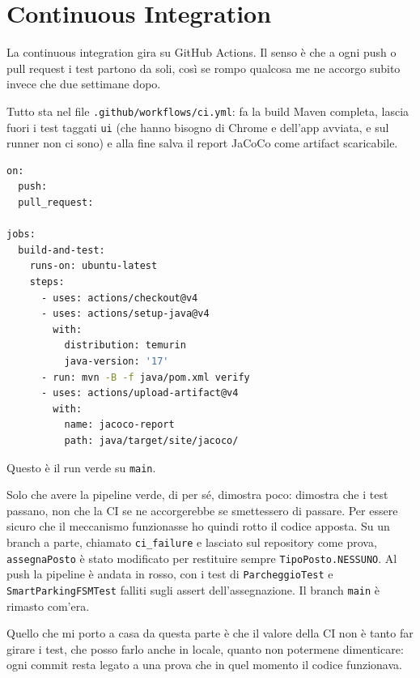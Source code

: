 \section{Continuous Integration}
\label{sec:ci}

La continuous integration gira su GitHub Actions. Il senso è che a ogni push o
pull request i test partono da soli, così se rompo qualcosa me ne accorgo subito invece
che due settimane dopo.

Tutto sta nel file \texttt{.github/workflows/ci.yml}: fa la build Maven completa, lascia
fuori i test taggati \texttt{ui} (che hanno bisogno di Chrome e dell'app avviata, e sul
runner non ci sono) e alla fine salva il report JaCoCo come artifact scaricabile.

\begin{lstlisting}[language=bash, caption={.github/workflows/ci.yml (estratto)}]
on:
  push:
  pull_request:

jobs:
  build-and-test:
    runs-on: ubuntu-latest
    steps:
      - uses: actions/checkout@v4
      - uses: actions/setup-java@v4
        with:
          distribution: temurin
          java-version: '17'
      - run: mvn -B -f java/pom.xml verify
      - uses: actions/upload-artifact@v4
        with:
          name: jacoco-report
          path: java/target/site/jacoco/
\end{lstlisting}


Questo è il run verde su \texttt{main}.

Solo che avere la pipeline verde, di per sé, dimostra poco: dimostra che i test passano,
non che la CI se ne accorgerebbe se smettessero di passare. Per essere sicuro che il
meccanismo funzionasse ho quindi rotto il codice apposta. Su un branch a parte, chiamato
\texttt{ci\_failure} e lasciato sul repository come prova, \texttt{assegnaPosto} è stato
modificato per restituire sempre \texttt{TipoPosto.NESSUNO}. Al push la
pipeline è andata in rosso, con i test di \texttt{ParcheggioTest} e
\texttt{SmartParkingFSMTest} falliti sugli assert dell'assegnazione. Il branch
\texttt{main} è rimasto com'era.


Quello che mi porto a casa da questa parte è che il valore della CI non è tanto far
girare i test, che posso farlo anche in locale, quanto non potermene dimenticare: ogni
commit resta legato a una prova che in quel momento il codice funzionava.
